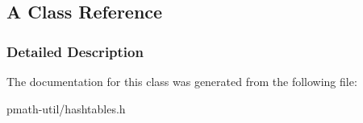 \hypertarget{class_a}{
\subsection{A Class Reference}
\label{class_a}
}


\subsubsection{Detailed Description}


The documentation for this class was generated from the following file:\begin{CompactItemize}
\item 
pmath-util/hashtables.h\end{CompactItemize}
